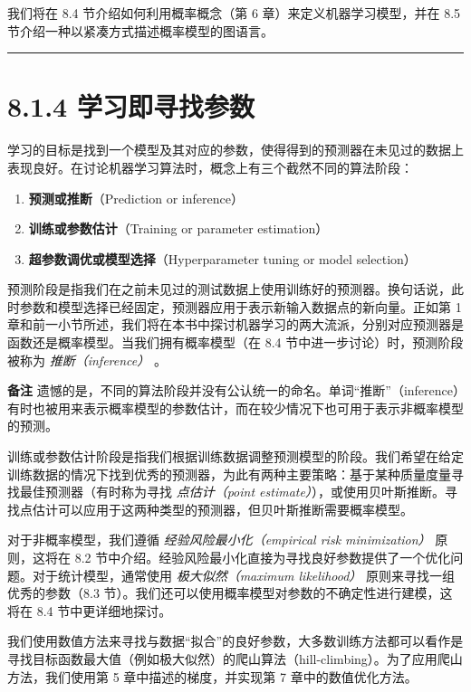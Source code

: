 我们将在 8.4 节介绍如何利用概率概念（第 6 章）来定义机器学习模型，并在 8.5 节介绍一种以紧凑方式描述概率模型的图语言。

\medskip\hrule\medskip

\section*{8.1.4 学习即寻找参数}

学习的目标是找到一个模型及其对应的参数，使得得到的预测器在未见过的数据上表现良好。在讨论机器学习算法时，概念上有三个截然不同的算法阶段：

\begin{enumerate}
\item \textbf{预测或推断}（Prediction or inference）
\item \textbf{训练或参数估计}（Training or parameter estimation）
\item \textbf{超参数调优或模型选择}（Hyperparameter tuning or model selection）
\end{enumerate}

预测阶段是指我们在之前未见过的测试数据上使用训练好的预测器。换句话说，此时参数和模型选择已经固定，预测器应用于表示新输入数据点的新向量。正如第 1 章和前一小节所述，我们将在本书中探讨机器学习的两大流派，分别对应预测器是函数还是概率模型。当我们拥有概率模型（在 8.4 节中进一步讨论）时，预测阶段被称为 \emph{推断（inference）} 。

\begin{notebox}
\textbf{备注} 遗憾的是，不同的算法阶段并没有公认统一的命名。单词“推断”（inference）有时也被用来表示概率模型的参数估计，而在较少情况下也可用于表示非概率模型的预测。
\end{notebox}

训练或参数估计阶段是指我们根据训练数据调整预测模型的阶段。我们希望在给定训练数据的情况下找到优秀的预测器，为此有两种主要策略：基于某种质量度量寻找最佳预测器（有时称为寻找 \emph{点估计（point estimate）}），或使用贝叶斯推断。寻找点估计可以应用于这两种类型的预测器，但贝叶斯推断需要概率模型。

对于非概率模型，我们遵循 \emph{经验风险最小化（empirical risk minimization）} 原则，这将在 8.2 节中介绍。经验风险最小化直接为寻找良好参数提供了一个优化问题。对于统计模型，通常使用 \emph{极大似然（maximum likelihood）} 原则来寻找一组优秀的参数（8.3 节）。我们还可以使用概率模型对参数的不确定性进行建模，这将在 8.4 节中更详细地探讨。

我们使用数值方法来寻找与数据“拟合”的良好参数，大多数训练方法都可以看作是寻找目标函数最大值（例如极大似然）的爬山算法（hill-climbing）。为了应用爬山方法，我们使用第 5 章中描述的梯度，并实现第 7 章中的数值优化方法。

